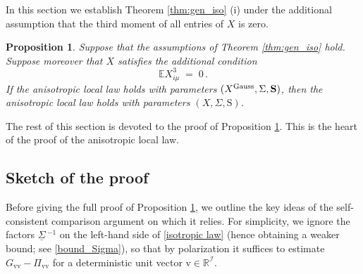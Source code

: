 \documentclass[11pt]{article} %
\numberwithin{equation}{section}
\numberwithin{figure}{section}
\theoremstyle{plain} %
\newtheorem{proposition}[theorem]{Proposition}
\theoremstyle{definition} %
\newcommand{\f}[1]{\boldsymbol{\mathrm{#1}}} %
\renewcommand{\cal}{\mathcal}
\newcommand{\ul}[1]{\underline{#1} \!\,} %
\newcommand{\txt}[1]{\text{\rm{#1}}}
\newcommand{\E}{\mathbb{E}}
\newcommand{\R}{\mathbb{R}}
\begin{document}
In this section we establish Theorem \ref{thm:gen_iso} (i) under the additional assumption that the third moment of all entries of $X$ is zero.

\begin{proposition} \label{prop:comparison_1}
Suppose that the assumptions of Theorem \ref{thm:gen_iso} hold. Suppose moreover that $X$ satisfies the additional condition
\begin{equation} \label{zero_third_moment}
\E X_{i \mu}^3 \;=\; 0\,.
\end{equation}
If the anisotropic local law holds with parameters $(X^{\txt{Gauss}}, \Sigma, \f S)$, then the anisotropic local law holds with parameters $(X, \Sigma, \f S)$.
\end{proposition}

The rest of this section is devoted to the proof of Proposition \ref{prop:comparison_1}. This is the heart of the proof of the anisotropic local law.


\subsection{Sketch of the proof} \label{sec:sketch_compar}
Before giving the full proof of Proposition \ref{prop:comparison_1}, we outline the key ideas of the self-consistent comparison argument on which it relies. For simplicity, we ignore the factors $\ul \Sigma^{-1}$ on the left-hand side of \eqref{isotropic law} (hence obtaining a weaker bound; see \eqref{bound_Sigma}), so that by polarization it suffices to estimate $G_{\f v \f v} - \Pi_{\f v \f v}$ for a deterministic unit vector $\f v \in \R^{\cal I}$.
\end{document}
